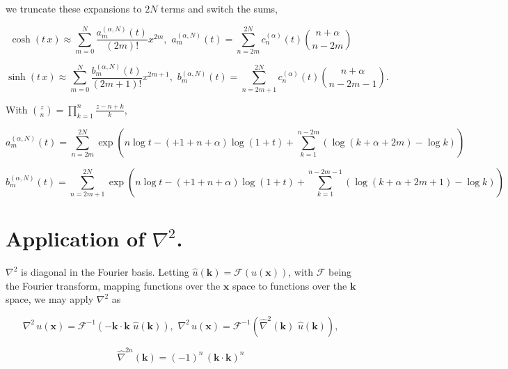 \documentclass[amsmath,amssymb,floatfix]{revtex4}
\numberwithin{equation}{section}
\begin{document}
\noindent
we truncate these expansions to $2N$ terms and switch the sums, 



\begin{equation}
\cosh{(t \, x)} \approx  \sum_{m=0}^{N}  \frac{a_m^{(\alpha,N)}(t)  }{(2m)!}   x^{2m}, \, \, a_m^{(\alpha,N)}(t)  =  \sum _{n=2m}^{2N}  {c}_n^{(\alpha)}(t)  \binom {n+\alpha} {n-2m}
\end{equation}

\begin{equation}
\sinh{(t \, x)} \approx  \sum_{m=0}^{N}  \frac{b_m^{(\alpha,N)}(t)  }{(2m+1)!}   x^{2m+1}, \, \, b_m^{(\alpha,N)}(t) =  \sum _{n=2m+1}^{2N}  {c}_n^{(\alpha)}(t)  \binom {n+\alpha} {n-2m-1}.
\end{equation}

With $\binom{z}{n} = \prod_{k=1}^{n} \frac{z-n+k}{k}$,

\begin{equation}
	a_m^{(\alpha,N)}(t)  =  \sum _{n=2m}^{2N}  \exp \left( n \log t - (+1+n+\alpha) \log (1+t) + \sum_{k=1}^{n-2m} \left( \log( k+\alpha +2m ) - \log{k} \right)   \right)
\end{equation}


\begin{equation}
	b_m^{(\alpha,N)}(t)  =  \sum _{n=2m+1}^{2N}  \exp \left( n \log t - (+1+n+\alpha) \log (1+t) + \sum_{k=1}^{n-2m-1} \left( \log( k+\alpha +2m+1 ) - \log{k} \right)   \right)
\end{equation}


\section{\label{sec:level3}Application of $\nabla^2$.\protect}

$\nabla^2$ is diagonal in the Fourier basis. Letting $\hat{u}(\mathbf{k}) = \mathcal{F} (u(\mathbf{x}))$, with $\mathcal{F}$ being the Fourier transform, mapping functions over the $\mathbf{x}$ space to functions over the $\mathbf{k}$ space, we may apply $\nabla^2$ as

\begin{equation}
\nabla^2 \, u(\mathbf{x}) = \mathcal{F}^{-1} (  - \mathbf{k} \cdot \mathbf{k} \, \, \hat{u}(\mathbf{k}) ), \, \, \nabla^2 \, u(\mathbf{x}) = \mathcal{F}^{-1} ( \hat{\nabla}^2 (\mathbf{k}) \, \, \hat{u}(\mathbf{k}) ),
\end{equation}


\begin{equation}
\hat{\nabla}^{2n} (\mathbf{k}) = (-1)^n \, ( \mathbf{k} \cdot \mathbf{k} )^n
\end{equation}
\end{document}
